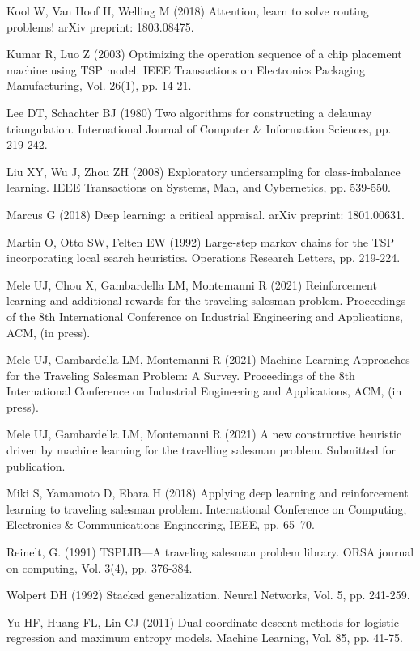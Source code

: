 \documentclass{article}
\begin{document}
\begin{thebibliography}{99}
Kool W, Van Hoof H, Welling M (2018)
\newblock Attention, learn to solve routing problems!
\newblock arXiv preprint: 1803.08475.

Kumar R, Luo Z (2003)
\newblock Optimizing the operation sequence of a chip placement machine using TSP model.
\newblock IEEE Transactions on Electronics Packaging Manufacturing, Vol. 26(1), pp. 14-21.


Lee DT, Schachter BJ (1980)
\newblock Two algorithms for constructing a delaunay triangulation.
\newblock International Journal of Computer \& Information Sciences, pp. 219-242.

Liu XY, Wu J, Zhou ZH (2008)
\newblock Exploratory undersampling for class-imbalance learning.
\newblock IEEE Transactions on Systems, Man, and Cybernetics, pp. 539-550.

Marcus G (2018)
\newblock Deep learning: a critical appraisal.
\newblock arXiv preprint: 1801.00631.

Martin O, Otto SW, Felten EW (1992)
\newblock Large-step markov chains for the TSP incorporating local search heuristics.
\newblock Operations Research Letters, pp. 219-224.

Mele UJ, Chou X, Gambardella LM, Montemanni R (2021)
\newblock Reinforcement learning and additional rewards for the traveling salesman problem.
\newblock Proceedings of the 8th International Conference on Industrial Engineering and Applications, ACM, (in press).

Mele UJ, Gambardella LM, Montemanni R (2021)
\newblock Machine Learning Approaches for the Traveling Salesman Problem: A Survey.
\newblock Proceedings of the 8th International Conference on Industrial Engineering and Applications, ACM, (in press).

Mele UJ, Gambardella LM, Montemanni R (2021)
\newblock A new constructive heuristic driven by machine learning for the travelling salesman problem.
\newblock Submitted for publication.

Miki S, Yamamoto D, Ebara H (2018)
\newblock Applying deep learning and reinforcement learning to traveling salesman problem.
\newblock International Conference on Computing, Electronics \& Communications Engineering, IEEE, pp. 65–70.



Reinelt, G. (1991)
\newblock TSPLIB—A traveling salesman problem library.
\newblock ORSA journal on computing, Vol. 3(4), pp. 376-384.


Wolpert DH (1992)
\newblock Stacked generalization.
\newblock Neural Networks, Vol. 5, pp. 241-259. 


Yu HF, Huang FL, Lin CJ (2011)
\newblock Dual coordinate descent methods for logistic regression and maximum entropy models.
\newblock Machine Learning, Vol. 85, pp. 41-75.





\end{thebibliography}
\end{document}
